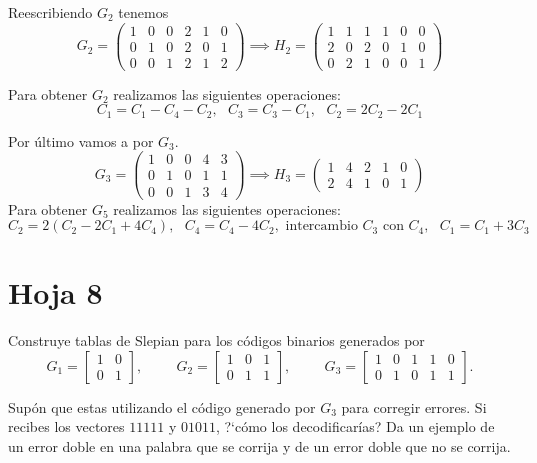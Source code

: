 \begin{problem}[16]
Reescribiendo $G_2$ tenemos
\[G_2=\left(\begin{array}{cccccc}
1 & 0 & 0 & 2 & 1 & 0 \\
0 & 1 & 0 & 2 & 0 & 1 \\
0 & 0 & 1 & 2 & 1 & 2
\end{array}\right) \implies H_2 = \left(\begin{array}{cccccc}
1 & 1 & 1 & 1 & 0 & 0 \\
2 & 0 & 2 & 0 & 1 & 0 \\
0 & 2 & 1 & 0 & 0 & 1
\end{array}\right)\]

Para obtener $G_2$ realizamos las siguientes operaciones:
\[C_1 = C_1-C_4-C_2, \text{ } C_3=C_3-C_1, \text{ } C_2=2C_2-2C_1\]

Por último vamos a por $G_3$.
\[G_3=\left(\begin{array}{ccccc}
1 & 0 & 0 & 4 & 3 \\
0 & 1 & 0 & 1 & 1 \\
0 & 0 & 1 & 3 & 4
\end{array}\right) \implies H_3=\left(\begin{array}{ccccc}
1 & 4 & 2 & 1 & 0 \\
2 & 4 & 1 & 0 & 1
\end{array}\right)\]
Para obtener $G_5$ realizamos las siguientes operaciones:
\[C_2 = 2(C_2-2C_1+4C_4), \text{ } C_4 = C_4-4C_2, \text{ intercambio }C_3 \text{ con }C_4, \text{ } C_1=C_1+3C_3\]
\end{problem}


\section{Hoja 8}
\begin{problem}[1]
\ppart Construye tablas de Slepian para los códigos binarios generados
por
\[
G_1=\left[\begin{array}{cc} 1&0\\0&1 \end{array}\right],
\hspace{1cm}
G_2=\left[\begin{array}{ccc} 1&0&1\\0&1&1 \end{array}\right],
\hspace{1cm}
G_3=\left[\begin{array}{ccccc} 1&0&1&1&0\\0&1&0&1&1
\end{array}\right].
\]

\ppart Supón que estas utilizando el código generado por $G_3$ para
corregir errores. Si recibes los vectores $11111$ y $01011$,
?`cómo los decodificarías? Da un ejemplo de un error doble en una
palabra que se corrija y de un error doble que no se corrija.

\solution
\end{problem}

